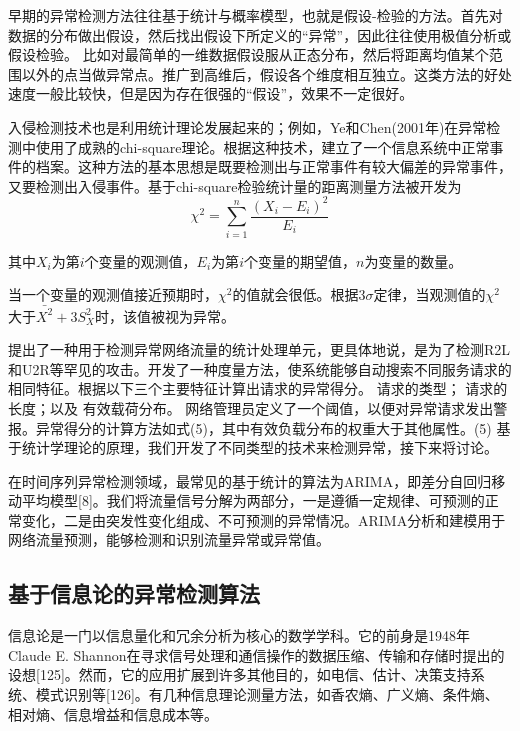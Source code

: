 早期的异常检测方法往往基于统计与概率模型，也就是假设-检验的方法。首先对数据的分布做出假设，然后找出假设下所定义的“异常”，因此往往使用极值分析或假设检验。
比如对最简单的一维数据假设服从正态分布，然后将距离均值某个范围以外的点当做异常点。推广到高维后，假设各个维度相互独立。这类方法的好处速度一般比较快，但是因为存在很强的“假设”，效果不一定很好。

入侵检测技术也是利用统计理论发展起来的；例如，Ye和Chen(2001年)在异常检测中使用了成熟的chi-square理论。根据这种技术，建立了一个信息系统中正常事件的档案。这种方法的基本思想是既要检测出与正常事件有较大偏差的异常事件，又要检测出入侵事件。基于chi-square检验统计量的距离测量方法被开发为
\begin{equation}
    \chi^2 = \sum_{i=1}^n \frac{(X_i - E_i)^2}{E_i}
\end{equation}

其中$X_i$为第$i$个变量的观测值，$E_i$为第$i$个变量的期望值，$n$为变量的数量。

当一个变量的观测值接近预期时，$\chi^2$的值就会很低。根据$3\sigma$定律，当观测值的$\chi^2$大于$\bar{X^2}+3S_X^2$时，该值被视为异常。

\citet{Christopher2002Service} 提出了一种用于检测异常网络流量的统计处理单元，更具体地说，是为了检测R2L和U2R等罕见的攻击。开发了一种度量方法，使系统能够自动搜索不同服务请求的相同特征。根据以下三个主要特征计算出请求的异常得分。
请求的类型；
请求的长度；以及
有效载荷分布。
网络管理员定义了一个阈值，以便对异常请求发出警报。异常得分的计算方法如式(5)，其中有效负载分布的权重大于其他属性。(5)
基于统计学理论的原理，我们开发了不同类型的技术来检测异常，接下来将讨论。

在时间序列异常检测领域，最常见的基于统计的算法为ARIMA，即差分自回归移动平均模型[8]。我们将流量信号分解为两部分，一是遵循一定规律、可预测的正常变化，二是由突发性变化组成、不可预测的异常情况。ARIMA分析和建模用于网络流量预测，能够检测和识别流量异常或异常值。


\subsection{基于信息论的异常检测算法}

信息论是一门以信息量化和冗余分析为核心的数学学科。它的前身是1948年Claude E. Shannon在寻求信号处理和通信操作的数据压缩、传输和存储时提出的设想[125]。然而，它的应用扩展到许多其他目的，如电信、估计、决策支持系统、模式识别等[126]。有几种信息理论测量方法，如香农熵、广义熵、条件熵、相对熵、信息增益和信息成本等。

